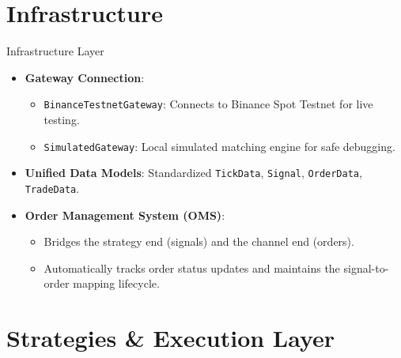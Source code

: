 \documentclass{beamer}
\begin{document}
\section{Infrastructure}

\begin{frame}{Infrastructure Layer}
    \begin{itemize}
        \item \textbf{Gateway Connection}:
        \begin{itemize}
            \item \texttt{BinanceTestnetGateway}: Connects to Binance Spot Testnet for live testing.
            \item \texttt{SimulatedGateway}: Local simulated matching engine for safe debugging.
        \end{itemize}
        \item \textbf{Unified Data Models}: Standardized \texttt{TickData}, \texttt{Signal}, \texttt{OrderData}, \texttt{TradeData}.
        \item \textbf{Order Management System (OMS)}:
        \begin{itemize}
            \item Bridges the strategy end (signals) and the channel end (orders).
            \item Automatically tracks order status updates and maintains the signal-to-order mapping lifecycle.
        \end{itemize}
    \end{itemize}
\end{frame}

\section{Strategies \& Execution Layer}
\end{document}
